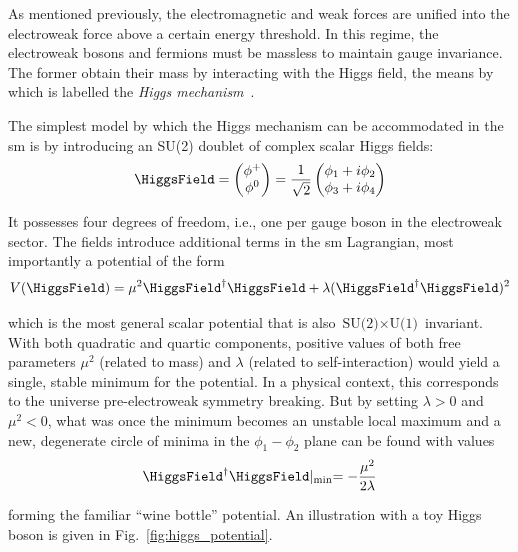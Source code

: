 As mentioned previously, the electromagnetic and weak forces are unified into the electroweak force above a certain energy threshold. In this regime, the electroweak bosons and fermions must be massless to maintain gauge invariance. The former obtain their mass by interacting with the Higgs field, the means by which is labelled the \emph{Higgs mechanism}~\cite{PhysRevLett.13.321,PhysRevLett.13.508,PhysRevLett.13.585}.

The simplest model by which the Higgs mechanism can be accommodated in the \acrshort{sm} is by introducing an SU(2) doublet of complex scalar Higgs fields:
\begin{equation}
    \HiggsField = \begin{pmatrix} \phi^+ \\ \phi^0 \end{pmatrix} = \frac{1}{\sqrt{2}} \begin{pmatrix} \phi_1 + i\phi_2 \\ \phi_3 + i\phi_4 \end{pmatrix}
    \label{eq:higgs_field}
\end{equation}

It possesses four degrees of freedom, i.e., one per gauge boson in the electroweak sector. The fields introduce additional terms in the \acrlong{sm} Lagrangian, most importantly a potential of the form
\begin{equation}
    V(\HiggsField) = \mu^2 \HiggsField^{\dagger} \HiggsField + \lambda (\HiggsField^{\dagger} \HiggsField)^2
    \label{eq:higgs_potential}
\end{equation}

which is the most general scalar potential that is also $\text{SU(2)} \times \text{U(1)}$ invariant. With both quadratic and quartic components, positive values of both free parameters $\mu^2$ (related to mass) and $\lambda$ (related to self-interaction) would yield a single, stable minimum for the potential. In a physical context, this corresponds to the universe pre-electroweak symmetry breaking. But by setting $\lambda > \text{0}$ and $\mu^2 < \text{0}$, what was once the minimum becomes an unstable local maximum and a new, degenerate circle of minima in the $\phi_1 - \phi_2$ plane can be found with values
\begin{equation}
    \HiggsField^{\dagger} \HiggsField \lvert_{\mathrm{min}} = -\frac{\mu^2}{2\lambda}
    \label{eq:higgs_mu_lambda}
\end{equation}

forming the familiar ``wine bottle'' potential. An illustration with a toy Higgs boson is given in Fig.~\ref{fig:higgs_potential}.

